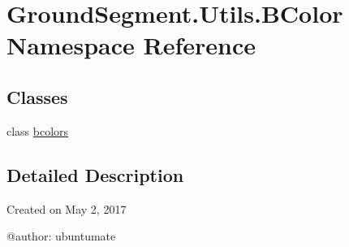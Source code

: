 \hypertarget{namespace_ground_segment_1_1_utils_1_1_b_color}{}\section{Ground\+Segment.\+Utils.\+B\+Color Namespace Reference}
\label{namespace_ground_segment_1_1_utils_1_1_b_color}
\subsection*{Classes}
\begin{DoxyCompactItemize}
\item 
class \hyperlink{class_ground_segment_1_1_utils_1_1_b_color_1_1bcolors}{bcolors}
\end{DoxyCompactItemize}


\subsection{Detailed Description}
\begin{DoxyVerb}Created on May 2, 2017

@author: ubuntumate
\end{DoxyVerb}
 